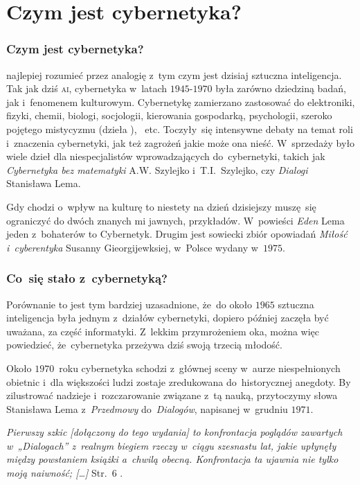 \documentclass[10pt,t]{beamer}
\begin{document}
\section{Czym jest cybernetyka?}


\begin{frame}
  \frametitle{Czym jest cybernetyka?}


  najlepiej rozumieć przez analogię z~tym czym jest dzisiaj sztuczna
  inteligencja. Tak jak dziś \textsc{ai}, cybernetyka w~latach
  $1945\text{-}1970$ była zarówno dziedziną badań, jak i~fenomenem
  kulturowym. Cybernetykę zamierzano zastosować do elektroniki, fizyki,
  chemii, biologi, socjologii, kierowania gospodarką, psychologii, szeroko
  pojętego mistycyzmu (dzieła
  ), ~etc. Toczyły~się intensywne debaty na temat roli i~znaczenia
  cybernetyki, jak też zagrożeń jakie może ona nieść. W~sprzedaży było
  wiele dzieł dla niespecjalistów wprowadzających do~cybernetyki, takich jak
  \textit{Cybernetyka bez matematyki} A.W. Szylejko i~T.I.~Szylejko, czy
  \textit{Dialogi} Stanisława Lema.

  Gdy chodzi o~wpływ na kulturę to niestety na dzień dzisiejszy muszę~się
  ograniczyć do dwóch znanych mi jawnych, przykładów. W~powieści
  \textit{Eden} Lema jeden z~bohaterów to Cybernetyk. Drugim jest sowiecki
  zbiór opowiadań \textit{Miłość i~cyberentyka} Susanny Gieorgijewksiej,
  w~Polsce wydany w~$1975$.

\end{frame}





\begin{frame}
  \frametitle{Co~się stało z~cybernetyką?}


  Porównanie to jest tym bardziej uzasadnione, że~do około $1965$ sztuczna
  inteligencja była jednym z~działów cybernetyki, dopiero później
  zaczęła być uważana, za część informatyki. Z~lekkim przymrożeniem oka,
  można więc powiedzieć, że~cybernetyka przeżywa dziś swoją trzecią młodość.

  Około $1970$~roku cybernetyka schodzi z~głównej sceny w~aurze
  niespełnionych obietnic i~dla większości ludzi zostaje zredukowana
  do~historycznej anegdoty. By zilustrować nadzieje i~rozczarowanie związane
  z~tą nauką, przytoczymy słowa Stanisława Lema z~\textit{Przedmowy}
  do~\textit{Dialogów}, napisanej w~grudniu $1971$.

  \textit{Pierwszy szkic [dołączony do tego wydania] to konfrontacja
    poglądów zawartych w~„Dialogach” z~realnym biegiem rzeczy w~ciągu
    szesnastu lat, jakie upłynęły między powstaniem książki a~chwilą
    obecną. Konfrontacja ta ujawnia nie tylko moją naiwność; [\ldots]}
  Str.~$6$ \parencite{Lem-Dialogi-Vol-I-Pub-1996}.

\end{frame}
\end{document}
